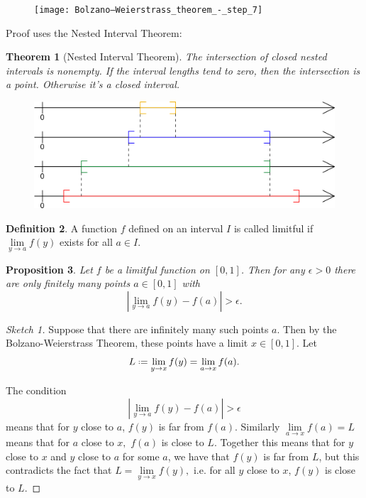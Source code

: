 \documentclass[12pt]{article}
\theoremstyle{plain}
\newtheorem{theorem}{Theorem}
\newtheorem{proposition}[theorem]{Proposition}
\theoremstyle{definition}
\newtheorem{definition}[theorem]{Definition}
\theoremstyle{remark}
\newcommand*{\defeq}{\mathrel{\vcenter{\baselineskip0.5ex \lineskiplimit0pt
                     \hbox{\scriptsize.}\hbox{\scriptsize.}}}
                     =}
\begin{document}
\begin{figure}[H]
\centering
\texttt{[image: Bolzano–Weierstrass\_theorem\_-\_step\_7]}
\end{figure}

Proof uses the Nested Interval Theorem:

\begin{theorem}[Nested Interval Theorem]
The intersection of closed nested intervals is nonempty. If the interval lengths tend to zero, then the intersection is a point. Otherwise it's a closed interval.
\end{theorem}

\begin{figure}[H]
\centering
\includegraphics[width=1.0\textwidth]{511px-Illustration_nested_intervals}
\end{figure}

\begin{definition}
A function $f$ defined on an interval $I$ is called limitful if $\lim\limits_{y\to a} f(y)$ exists for all $a \in I$.
\end{definition}

\begin{proposition}
Let $f$ be a limitful function on $[0, 1]$. Then for any $\epsilon > 0$ there are only finitely many points $a \in [0, 1]$ with $$|\lim\limits_{y\to a} f(y) - f(a)| > \epsilon.$$
\end{proposition}

\begin{proof}[Sketch 1]
Suppose that there are infinitely many such points $a.$ Then by the Bolzano-Weierstrass Theorem, these points have a limit $x \in [0, 1].$ Let $$L \defeq \lim\limits_{y \to x} f(y) = \lim\limits_{a\to x} f(a).$$

The condition $$|\lim\limits_{y\to a} f(y) - f(a)| > \epsilon$$ means that for $y$ close to $a$, $f(y)$ is far from $f(a).$ Similarly $\lim\limits_{a \to x} f(a) = L$ means that for $a$ close to $x,$ $f(a)$ is close to $L.$ Together this means that for $y$ close to $x$ and $y$ close to $a$ for some $a$, we have that $f(y)$ is far from $L$, but this contradicts the fact that $L = \lim\limits_{y \to x} f(y),$ i.e. for all $y$ close to $x$, $f(y)$ is close to $L.$
\end{proof}
\end{document}
